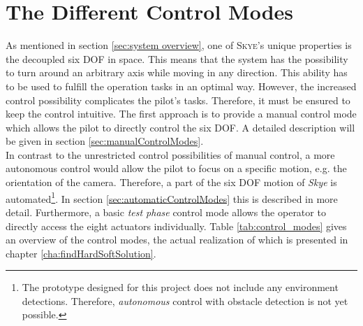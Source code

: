 \graphicspath{{graphics/HMI/}{graphics/control_modes/}}
\chapter{The Different Control Modes}
\label{cha:DifferentControlModes}


As mentioned in section \ref{sec:system overview}, one of \textsc{Skye}'s unique properties is the decoupled six DOF in space. This means that the system has the possibility to turn around an arbitrary axis while moving in any direction. This ability has to be used to fulfill the operation tasks in an optimal way. 
However, the increased control possibility complicates the pilot's tasks. Therefore, it must be ensured to keep the control intuitive.
The first approach is to provide a manual control mode which allows the pilot to directly control the six DOF. A detailed description will be given in section \ref{sec:manualControlModes}. \\ 
In contrast to the unrestricted control possibilities of manual control, a more autonomous control would allow the pilot to focus on a specific motion, e.g. the orientation of the camera. Therefore, a part of the six DOF motion of \textit{Skye} is automated\footnote{The prototype designed for this project does not include any environment detections. Therefore, \textit{autonomous} control with obstacle detection is not yet possible.}. In section \ref{sec:automaticControlModes} this is described in more detail. Furthermore, a basic \textit{test phase} control mode allows the operator to directly access the eight actuators individually. Table \ref{tab:control_modes} gives an overview of the control modes, the actual realization of which is presented in chapter \ref{cha:findHardSoftSolution}.

